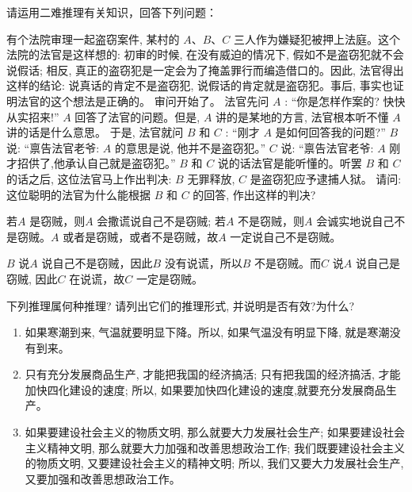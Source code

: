 \documentclass{ctexart}
\begin{document}
\begin{problem}\label{pro:4}
  请运用二难推理有关知识，回答下列问题：

  有个法院审理一起盗窃案件, 某村的 $A 、 B 、 C$ 三人作为嫌疑犯被押上法庭。这个法院的法官是这样想的: 初审的时候, 在没有威迫的情况下, 假如不是盗窃犯就不会说假话; 相反, 真正的盗窃犯是一定会为了掩盖罪行而编造借口的。因此, 法官得出这样的结论: 说真话的肯定不是盗窃犯, 说假话的肯定就是盗窃犯。事后, 事实也证明法官的这个想法是正确的。
  审问开始了。
  法官先问 $A$ :
  “你是怎样作案的? 快快从实招来!”
  $A$ 回答了法官的问题。但是, $A$ 讲的是某地的方言, 法官根本听不懂 $A$讲的话是什么意思。
  于是, 法官就问 $B$ 和 $C$ :
  “刚才 $A$ 是如何回答我的问题?”
  $B$ 说: “禀告法官老爷: $A$ 的意思是说, 他并不是盗窃犯。”
  $C$ 说: “禀告法官老爷: $A$ 刚才招供了,他承认自己就是盗窃犯。”
  $B$ 和 $C$ 说的话法官是能听懂的。听罢 $B$ 和 $C$ 的话之后, 这位法官马上作出判决: $B$ 无罪释放, $C$ 是盗窃犯应予逮捕人狱。
  请问: 这位聪明的法官为什么能根据 $B$ 和 $C$ 的回答, 作出这样的判决?
\end{problem}
\begin{solution}
  若\(A\) 是窃贼，则\(A\) 会撒谎说自己不是窃贼; 若\(A\) 不是窃贼，则\(A\) 会诚实地说自己不是窃贼。\(A\) 或者是窃贼，或者不是窃贼，故\(A\) 一定说自己不是窃贼。

  \(B\) 说\(A\) 说自己不是窃贼，因此\(B\) 没有说谎，所以\(B\) 不是窃贼。而\(C\) 说\(A\) 说自己是窃贼, 因此\(C\) 在说谎，故\(C\) 一定是窃贼。
\end{solution}
\begin{problem}\label{pro:5}

  下列推理属何种推理? 请列出它们的推理形式, 并说明是否有效?为什么?
  \begin{enumerate}
    \item 如果寒潮到来, 气温就要明显下降。所以, 如果气温没有明显下降, 就是寒潮没有到来。
    \item 只有充分发展商品生产, 才能把我国的经济搞活; 只有把我国的经济搞活, 才能加快四化建设的速度; 所以, 如果要加快四化建设的速度,就要充分发展商品生产。
    \item 如果要建设社会主义的物质文明, 那么就要大力发展社会生产; 如果要建设社会主义精神文明, 那么就要大力加强和改善思想政治工作; 我们既要建设社会主义的物质文明, 又要建设社会主义的精神文明; 所以, 我们又要大力发展社会生产, 又要加强和改善思想政治工作。
  \end{enumerate}
\end{problem}
\end{document}
